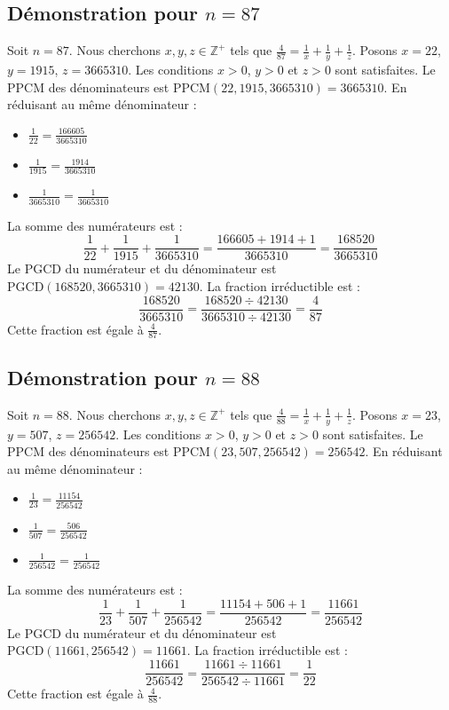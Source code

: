 \documentclass[11pt,a4paper]{article}
\begin{document}
\subsection{Démonstration pour $n = 87$}
Soit $n = 87$. Nous cherchons $x, y, z \in \mathbb{Z}^{+}$ tels que $\frac{4}{87} = \frac{1}{x} + \frac{1}{y} + \frac{1}{z}$.
Posons $x = 22$, $y = 1915$, $z = 3665310$.
Les conditions $x > 0$, $y > 0$ et $z > 0$ sont satisfaites.
Le PPCM des dénominateurs est $\text{PPCM}(22, 1915, 3665310) = 3665310$.
En réduisant au même dénominateur :
\begin{itemize}
    \item $\frac{1}{22} = \frac{166605}{3665310}$
    \item $\frac{1}{1915} = \frac{1914}{3665310}$
    \item $\frac{1}{3665310} = \frac{1}{3665310}$
\end{itemize}
La somme des numérateurs est :
$$ \frac{1}{22} + \frac{1}{1915} + \frac{1}{3665310} = \frac{166605 + 1914 + 1}{3665310} = \frac{168520}{3665310} $$
Le PGCD du numérateur et du dénominateur est $\text{PGCD}(168520, 3665310) = 42130$.
La fraction irréductible est :
$$ \frac{168520}{3665310} = \frac{168520 \div 42130}{3665310 \div 42130} = \frac{4}{87} $$
Cette fraction est égale à $\frac{4}{87}$.

\subsection{Démonstration pour $n = 88$}
Soit $n = 88$. Nous cherchons $x, y, z \in \mathbb{Z}^{+}$ tels que $\frac{4}{88} = \frac{1}{x} + \frac{1}{y} + \frac{1}{z}$.
Posons $x = 23$, $y = 507$, $z = 256542$.
Les conditions $x > 0$, $y > 0$ et $z > 0$ sont satisfaites.
Le PPCM des dénominateurs est $\text{PPCM}(23, 507, 256542) = 256542$.
En réduisant au même dénominateur :
\begin{itemize}
    \item $\frac{1}{23} = \frac{11154}{256542}$
    \item $\frac{1}{507} = \frac{506}{256542}$
    \item $\frac{1}{256542} = \frac{1}{256542}$
\end{itemize}
La somme des numérateurs est :
$$ \frac{1}{23} + \frac{1}{507} + \frac{1}{256542} = \frac{11154 + 506 + 1}{256542} = \frac{11661}{256542} $$
Le PGCD du numérateur et du dénominateur est $\text{PGCD}(11661, 256542) = 11661$.
La fraction irréductible est :
$$ \frac{11661}{256542} = \frac{11661 \div 11661}{256542 \div 11661} = \frac{1}{22} $$
Cette fraction est égale à $\frac{4}{88}$.
\end{document}
